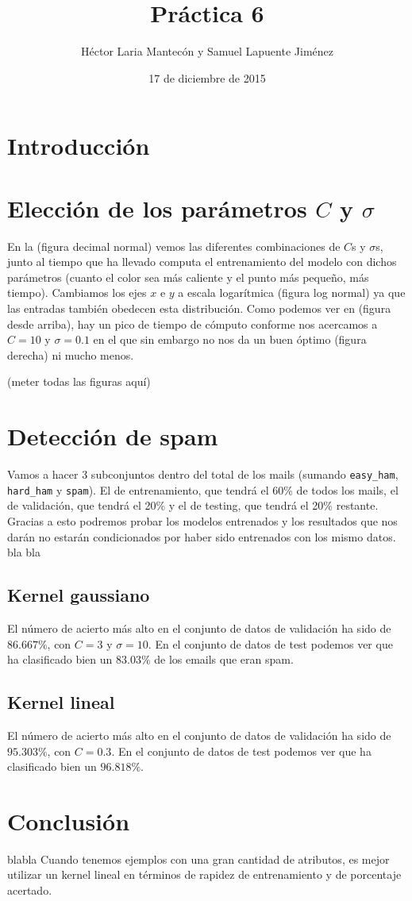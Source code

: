 \documentclass{article}
\title{Práctica 6}
\author{Héctor Laria Mantecón y Samuel Lapuente Jiménez}
\date{17 de diciembre de 2015}
\begin{document}
\maketitle

\section{Introducción}

\section{Elección de los parámetros $C$ y $\sigma$}
En la (figura decimal normal) vemos las diferentes combinaciones de $C$s y $\sigma$s, junto al tiempo que ha llevado computa el entrenamiento del modelo con dichos parámetros (cuanto el color sea más caliente y el punto más pequeño, más tiempo).
Cambiamos los ejes $x$ e $y$ a escala logarítmica (figura log normal) ya que las entradas también obedecen esta distribución.
Como podemos ver en (figura desde arriba), hay un pico de tiempo de cómputo conforme nos acercamos a $C = 10$ y $\sigma = 0.1$ en el que sin embargo no nos da un buen óptimo (figura derecha) ni mucho menos.

(meter todas las figuras aquí)

\section{Detección de spam}
Vamos a hacer 3 subconjuntos dentro del total de los mails (sumando {\tt easy_ham}, {\tt hard_ham} y {\tt spam}). El de entrenamiento, que tendrá el 60\% de todos los mails, el de validación, que tendrá el 20\% y el de testing, que tendrá el 20\% restante. Gracias a esto podremos probar los modelos entrenados y los resultados que nos darán no estarán condicionados por haber sido entrenados con los mismo datos.
bla bla
\subsection{Kernel gaussiano}
El número de acierto más alto en el conjunto de datos de validación ha sido de $86.667\%$, con $C = 3$ y $\sigma = 10$.
En el conjunto de datos de test podemos ver que ha clasificado bien un $83.03\%$ de los emails que eran spam.

\subsection{Kernel lineal}
El número de acierto más alto en el conjunto de datos de validación ha sido de $95.303\%$, con $C = 0.3$.
En el conjunto de datos de test podemos ver que ha clasificado bien un $96.818\%$.

\section{Conclusión}
blabla
Cuando tenemos ejemplos con una gran cantidad de atributos, es mejor utilizar un kernel lineal en términos de rapidez de entrenamiento y de porcentaje acertado.
\end{document}
